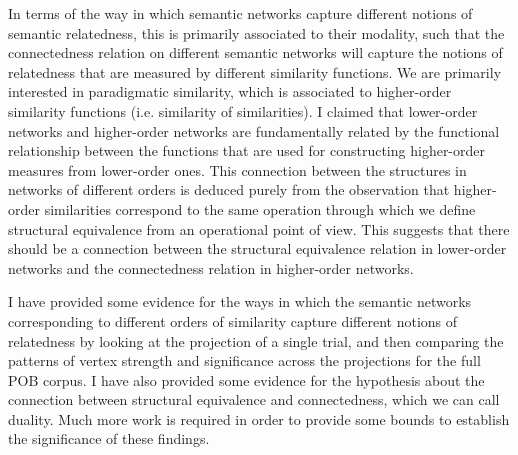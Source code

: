 In terms of the way in which semantic networks capture different notions of semantic relatedness, this is primarily associated to their modality, such that the connectedness relation on different semantic networks will capture the notions of relatedness that are measured by different similarity functions.
We are primarily interested in paradigmatic similarity, which is associated to higher-order similarity functions (i.e. similarity of similarities).
I claimed that lower-order networks and higher-order networks are fundamentally related by the functional relationship between the functions that are used for constructing higher-order measures from lower-order ones.
This connection between the structures in networks of different orders is deduced purely from the observation that higher-order similarities correspond to the same operation through which we define structural equivalence from an operational point of view.
This suggests that there should be a connection between the structural equivalence relation in lower-order networks and the connectedness relation in higher-order networks.

I have provided some evidence for the ways in which the semantic networks corresponding to different orders of similarity capture different notions of relatedness by looking at the projection of a single trial, and then comparing the patterns of vertex strength and significance across the projections for the full POB corpus.
I have also provided some evidence for the hypothesis about the connection between structural equivalence and connectedness, which we can call duality.
Much more work is required in order to provide some bounds to establish the significance of these findings.

